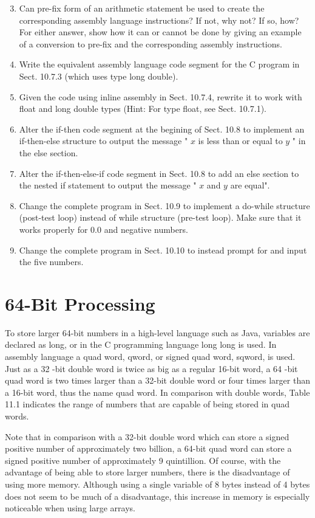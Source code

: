 \documentclass[10pt]{book}
\begin{document}
\begin{center}
\begin{center}
\begin{center}
\begin{center}
\begin{enumerate}
  \setcounter{enumi}{2}
  \item Can pre-fix form of an arithmetic statement be used to create the corresponding assembly language instructions? If not, why not? If so, how? For either answer, show how it can or cannot be done by giving an example of a conversion to pre-fix and the corresponding assembly instructions.
  \item Write the equivalent assembly language code segment for the C program in Sect. 10.7.3 (which uses type long double).
  \item Given the code using inline assembly in Sect. 10.7.4, rewrite it to work with float and long double types (Hint: For type float, see Sect. 10.7.1).
  \item Alter the if-then code segment at the begining of Sect. 10.8 to implement an if-then-else structure to output the message " $x$ is less than or equal to $y$ " in the else section.
  \item Alter the if-then-else-if code segment in Sect. 10.8 to add an else section to the nested if statement to output the message " $x$ and $y$ are equal".
  \item Change the complete program in Sect. 10.9 to implement a do-while structure (post-test loop) instead of while structure (pre-test loop). Make sure that it works properly for 0.0 and negative numbers.
  \item Change the complete program in Sect. 10.10 to instead prompt for and input the five numbers.
\end{enumerate}

\section*{64-Bit Processing}
To store larger 64-bit numbers in a high-level language such as Java, variables are declared as long, or in the C programming language long long is used. In assembly language a quad word, qword, or signed quad word, sqword, is used. Just as a 32 -bit double word is twice as big as a regular 16-bit word, a 64 -bit quad word is two times larger than a 32-bit double word or four times larger than a 16-bit word, thus the name quad word. In comparison with double words, Table 11.1 indicates the range of numbers that are capable of being stored in quad words.


Note that in comparison with a 32-bit double word which can store a signed positive number of approximately two billion, a 64-bit quad word can store a signed positive number of approximately 9 quintillion. Of course, with the advantage of being able to store larger numbers, there is the disadvantage of using more memory. Although using a single variable of 8 bytes instead of 4 bytes does not seem to be much of a disadvantage, this increase in memory is especially noticeable when using large arrays.


\end{center}
\end{center}
\end{center}
\end{center}
\end{document}
